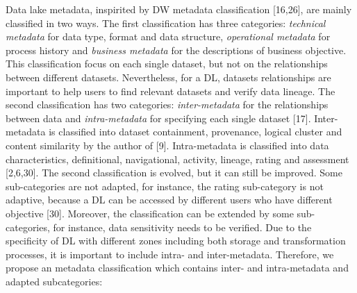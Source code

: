 \documentclass[a4paper,12pt,notitlepage,twoside,openright]{article}
\begin{document}
Data lake metadata, inspirited by DW metadata classification
{[}16,26{]}, are mainly classified in two ways. The first classification
has three categories: \emph{technical metadata} for data type, format
and data structure, \emph{operational metadata} for process history and
\emph{business metadata} for the descriptions of business objective.
This classification focus on each single dataset, but not on the
relationships between different datasets. Nevertheless, for a DL,
datasets relationships are important to help users to find relevant
datasets and verify data lineage. The second classification has two
categories: \emph{inter-metadata} for the relationships between data and
\emph{intra-metadata} for specifying each single dataset {[}17{]}.
Inter-metadata is classified into dataset containment, provenance,
logical cluster and content similarity by the author of {[}9{]}.
Intra-metadata is classified into data characteristics, definitional,
navigational, activity, lineage, rating and assessment {[}2,6,30{]}. The
second classification is evolved, but it can still be improved. Some
sub-categories are not adapted, for instance, the rating sub-category is
not adaptive, because a DL can be accessed by different users who have
different objective {[}30{]}. Moreover, the classification can be
extended by some sub-categories, for instance, data sensitivity needs to
be verified. Due to the specificity of DL with different zones including
both storage and transformation processes, it is important to include
intra- and inter-metadata. Therefore, we propose an metadata
classification which contains inter- and intra-metadata and adapted
subcategories:
\end{document}
